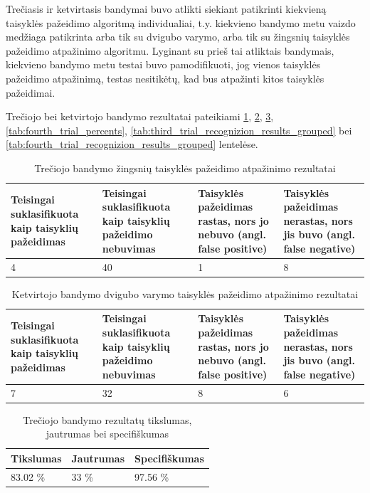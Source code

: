 \documentclass{VUMIFPSbakalaurinis}
\begin{document}
Trečiasis ir ketvirtasis bandymai buvo atlikti siekiant patikrinti kiekvieną taisyklės pažeidimo algoritmą individualiai, t.y. kiekvieno bandymo metu vaizdo medžiaga patikrinta arba tik su dvigubo varymo, arba tik su žingsnių taisyklės pažeidimo atpažinimo algoritmu. Lyginant su prieš tai atliktais bandymais, kiekvieno bandymo metu testai buvo pamodifikuoti, jog vienos taisyklės pažeidimo atpažinimą, testas nesitikėtų, kad bus atpažinti kitos taisyklės pažeidimai. 

Trečiojo bei ketvirtojo bandymo rezultatai pateikiami \ref{tab:third_trial}, \ref{tab:fourth_trial}, \ref{tab:third_trial_percents}, \ref{tab:fourth_trial_percents}, \ref{tab:third_trial_recognizion_results_grouped} bei \ref{tab:fourth_trial_recognizion_results_grouped} lentelėse. 

\begin{table}[H]\footnotesize
	\centering
	\caption{Trečiojo bandymo žingsnių taisyklės pažeidimo atpažinimo rezultatai}
	{\begin{tabular}{|p{3cm}|p{3cm}|p{3cm}|p{2cm}|} \hline
			\textbf{Teisingai suklasifikuota kaip taisyklių pažeidimas} & \textbf{Teisingai suklasifikuota kaip taisyklių pažeidimo nebuvimas} & \textbf{Taisyklės pažeidimas rastas, nors jo nebuvo (angl. false positive)} & \textbf{Taisyklės pažeidimas nerastas, nors jis buvo (angl. false negative)} \\
			\hline
			4  & 40    & 1    & 8      \\
			\hline
	\end{tabular}}
	\label{tab:third_trial}
\end{table}

\begin{table}[H]\footnotesize
	\centering
	\caption{Ketvirtojo bandymo dvigubo varymo taisyklės pažeidimo atpažinimo rezultatai}
	{\begin{tabular}{|p{3cm}|p{3cm}|p{3cm}|p{2cm}|} \hline
			\textbf{Teisingai suklasifikuota kaip taisyklių pažeidimas} & \textbf{Teisingai suklasifikuota kaip taisyklių pažeidimo nebuvimas} & \textbf{Taisyklės pažeidimas rastas, nors jo nebuvo (angl. false positive)} & \textbf{Taisyklės pažeidimas nerastas, nors jis buvo (angl. false negative)} \\
			\hline
			7  & 32    & 8    & 6   \\
			\hline
	\end{tabular}}
	\label{tab:fourth_trial}
\end{table}

\begin{table}[H]\footnotesize
	\centering
	\caption{Trečiojo bandymo rezultatų tikslumas, jautrumas bei specifiškumas}
	{\begin{tabular}{|p{5cm}|p{5cm}|p{5cm}|} \hline
			\textbf{Tikslumas} & \textbf{Jautrumas} & \textbf{Specifiškumas} \\
			\hline
			83.02 \%  & 33 \%    & 97.56 \%    \\
			
			\hline
	\end{tabular}}
	\label{tab:third_trial_percents}
\end{table}
\end{document}
